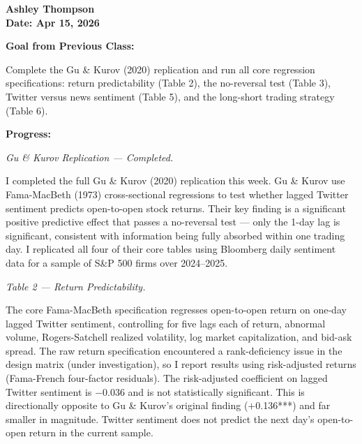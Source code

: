 \documentclass[12pt]{article}
\begin{document}
\noindent\textbf{Ashley Thompson}\\
\textbf{Date: Apr 15, 2026}

\bigskip

\noindent\textbf{Goal from Previous Class:}

Complete the Gu \& Kurov (2020) replication and run all core regression specifications: return predictability (Table 2), the no-reversal test (Table 3), Twitter versus news sentiment (Table 5), and the long-short trading strategy (Table 6).

\bigskip

\noindent\textbf{Progress:}

\noindent\textit{Gu \& Kurov Replication --- Completed.}

I completed the full Gu \& Kurov (2020) replication this week. Gu \& Kurov use Fama-MacBeth (1973) cross-sectional regressions to test whether lagged Twitter sentiment predicts open-to-open stock returns. Their key finding is a significant positive predictive effect that passes a no-reversal test --- only the 1-day lag is significant, consistent with information being fully absorbed within one trading day. I replicated all four of their core tables using Bloomberg daily sentiment data for a sample of S\&P 500 firms over 2024--2025.

\medskip

\noindent\textit{Table 2 --- Return Predictability.}

The core Fama-MacBeth specification regresses open-to-open return on one-day lagged Twitter sentiment, controlling for five lags each of return, abnormal volume, Rogers-Satchell realized volatility, log market capitalization, and bid-ask spread. The raw return specification encountered a rank-deficiency issue in the design matrix (under investigation), so I report results using risk-adjusted returns (Fama-French four-factor residuals). The risk-adjusted coefficient on lagged Twitter sentiment is $-$0.036 and is not statistically significant. This is directionally opposite to Gu \& Kurov's original finding ($+$0.136***) and far smaller in magnitude. Twitter sentiment does not predict the next day's open-to-open return in the current sample.
\end{document}
